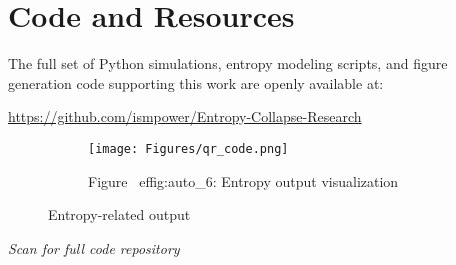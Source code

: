 \documentclass[12pt]{article}
\begin{document}
\section*{Code and Resources}

The full set of Python simulations, entropy modeling scripts, and figure generation code supporting this work are openly available at:
\begin{center}
\url{https://github.com/ismpower/Entropy-Collapse-Research}
\begin{figure}[H]
\centering
\begin{figure}[H]
\centering
\texttt{[image: Figures/qr\_code.png]}
\caption{Figure~
ef{fig:auto_6}: Entropy output visualization}
\label{fig:auto_6}
\end{figure}
\caption{Entropy-related output}
\label{fig:Figures_qr_code_png}
\end{figure}

\textit{Scan for full code repository}\

\end{center}
\end{document}

